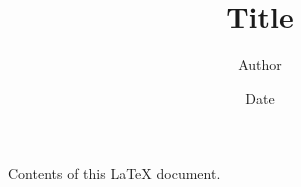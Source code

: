 \documentclass[a4paper]{article}
\title{Title}
\author{Author}
\date{Date}
\begin{document}
	\maketitle
	Contents of this \LaTeX{} document.
\end{document}
